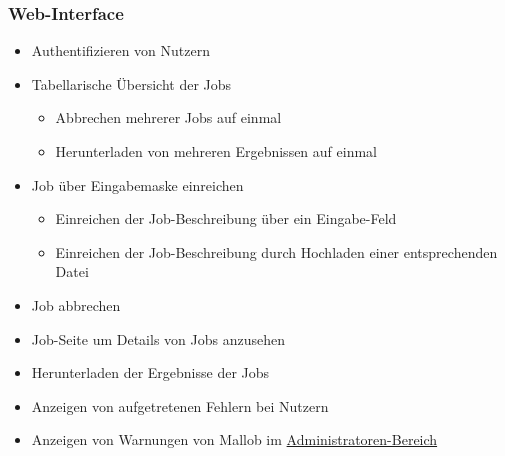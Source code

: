    \subsubsection{Web-Interface}
        \begin{itemize}[noitemsep]
            \item Authentifizieren von Nutzern
            \item Tabellarische Übersicht  der Jobs
                \begin{itemize}[noitemsep]
                    \item Abbrechen mehrerer Jobs auf einmal
                    \item Herunterladen von mehreren Ergebnissen auf einmal
                \end{itemize}
            \item Job über Eingabemaske einreichen
                \begin{itemize}[noitemsep]
                    \item Einreichen der Job-Beschreibung über ein Eingabe-Feld
                    \item Einreichen der Job-Beschreibung durch Hochladen einer entsprechenden Datei
                \end{itemize}
            \item Job abbrechen
            \item Job-Seite um Details von Jobs anzusehen
            \item Herunterladen der Ergebnisse der Jobs
            \item Anzeigen von aufgetretenen Fehlern bei Nutzern
            \item Anzeigen von Warnungen von Mallob im \hyperref[pages:admin]{Administratoren-Bereich}  
            
                      
        \end{itemize}
